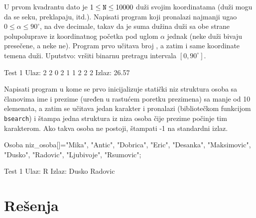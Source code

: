 \begin{Exercise}[label=406]
  U prvom kvadrantu dato je $1 \leq \texttt{N} \leq 10000$ duži svojim
  koordinatama (duži mogu da se seku, preklapaju, itd.). Napisati
  program koji pronalazi najmanji ugao $0 \leq \alpha \leq 90^\circ$,
  na dve decimale, takav da je suma dužina duži sa obe strane
  polupoluprave iz koordinatnog početka pod uglom $\alpha$ jednak
  (neke duži bivaju presečene, a neke ne). Program prvo učitava broj
  , a zatim i same koordinate temena duži. Uputstvo: vršiti
  binarnu pretragu intervala $[0, 90^\circ]$.
  
\begin{minitest}
\begin{test}{Test 1}
Ulaz:
2
2 0 2 1
1 2 2 2
Izlaz:
26.57 
\end{test}
\end{minitest}
  
\end{Exercise}

\begin{Exercise}[label=407]
  Napisati program u kome se prvo inicijalizuje statički niz struktura
  osoba sa članovima ime i prezime (uređen u rastućem poretku
  prezimena) sa manje od 10 elemenata, a zatim se učitava jedan
  karakter i pronalazi (bibliotečkom funkcijom \verb|bsearch|) i
  štampa jedna struktura iz niza osoba čije prezime počinje tim
  karakterom. Ako takva osoba ne postoji, štampati -1 na standardni
  izlaz.
\begin{ckod}
Osoba niz_osoba[]={{"Mika", "Antic"},
                   {"Dobrica", "Eric"},
                   {"Desanka", "Maksimovic"},
                   {"Dusko", "Radovic"},
                   {"Ljubivoje", "Rsumovic"}};
\end{ckod}
  
\begin{minitest}
\begin{test}{Test 1}
Ulaz:  R
Izlaz: Dusko Radovic
\end{test}
\end{minitest}
  
\end{Exercise}


\section{Rešenja}

\shipoutAnswer



